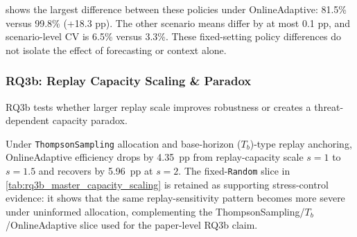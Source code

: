  shows the largest difference between these policies under OnlineAdaptive: 81.5\% versus 99.8\% (+18.3 pp). The other scenario means differ by at most 0.1 pp, and scenario-level CV is 6.5\% versus 3.3\%. These fixed-setting policy differences do not isolate the effect of forecasting or context alone.

\subsubsection{RQ3b: Replay Capacity Scaling \& Paradox}
\label{subsec:rq3b_answer}

RQ3b tests whether larger replay scale improves robustness or creates a threat-dependent capacity paradox.

Under \texttt{ThompsonSampling} allocation and base-horizon ($T_b$)-type replay anchoring, OnlineAdaptive efficiency drops by 4.35~pp from replay-capacity scale $s{=}1$ to $s{=}1.5$ and recovers by 5.96~pp at $s{=}2$. The fixed-\texttt{Random} slice in \cref{tab:rq3b_master_capacity_scaling} is retained as supporting stress-control evidence: it shows that the same replay-sensitivity pattern becomes more severe under uninformed allocation, complementing the ThompsonSampling/$T_b$/OnlineAdaptive slice used for the paper-level RQ3b claim.


